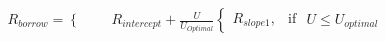 \documentclass[preview]{standalone}
\begin{document}
\begin{align*}
R_{borrow} = \begin{cases} \\[6pt] & \text{ } \end{cases} R_{intercept}  +  \frac{U}{U_{Optimal}} \begin{cases}R_{slope1}, & \text{if } \end{cases} U \leq U_{optimal}
\end{align*}
\end{document}
